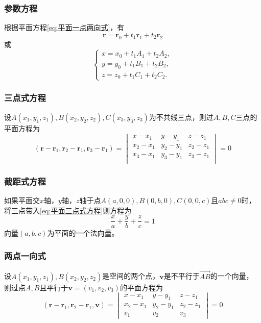 \subsubsection{参数方程}
根据平面方程\ref{eq:平面一点两向式}，有
\begin{equation}
    \label{eq:平面参数方程}
    \bm{r} = \bm{r}_0 + t_1\bm{r}_1 + t_2\bm{r}_2
\end{equation}
或
\begin{equation}
    \begin{cases}
        x = x_0 + t_1 A_1 + t_2A_2, \\
        y = y_0 + t_1 B_1 + t_2B_2, \\
        z = z_0 + t_1 C_1 + t_2C_2.
    \end{cases}
\end{equation}

\subsubsection{三点式方程}
设$A(x_1,y_1,z_1),B(x_2,y_2,z_2),C(x_3,y_3,z_3)$为不共线三点，则过$A,B,C$三点的平面方程为
\begin{equation}
    \label{eq:平面三点式方程}
    (\bm{r}-\bm{r}_1,\bm{r}_2-\bm{r}_1, \bm{r}_3-\bm{r}_1)
    =
    \begin{vmatrix}
        x-x_1   & y-y_1   & z-z_1   \\
        x_2-x_1 & y_2-y_1 & z_2-z_1 \\
        x_3-x_1 & y_3-y_1 & z_3-z_1 \\
    \end{vmatrix}
    =0
\end{equation}

\subsubsection{截距式方程}
如果平面交$x$轴，$y$轴，$z$轴于点$A(a,0,0),B(0,b,0),C(0,0,c)$且$abc\neq 0$时，将三点带入\ref{eq:平面三点式方程}则方程为
\begin{equation}
    \label{eq:平面截距式方程}
    \frac{x}{a} + \frac{y}{b} + \frac{z}{c} = 1
\end{equation}
向量$(a,b,c)$为平面的一个法向量。

\subsubsection{两点一向式}
设$A(x_1,y_1,z_1),B(x_2,y_2,z_2)$是空间的两个点，$\bm{v}$是不平行于$\overrightarrow{AB}$的一个向量，
则过点$A,B$且平行于$\bm{v}=(v_1,v_2,v_3)$的平面方程为
\begin{equation}
    \label{eq:平面两点一向式}
    (\bm{r}-\bm{r}_1,\bm{r}_2-\bm{r}_1,\bm{v}) =
    \begin{vmatrix}
        x-x_1   & y-y_1   & z-z_1   \\
        x_2-x_1 & y_2-y_1 & z_2-z_1 \\
        v_1     & v_2     & v_3
    \end{vmatrix}
    =0
\end{equation}


